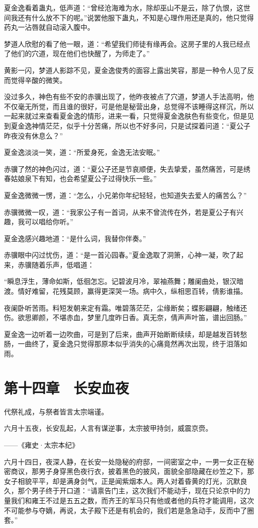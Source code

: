夏金逸看着蛊丸，低声道：“曾经沧海难为水，除却巫山不是云，除了仇恨，这世间我还有什么放不下的呢。”说罢他服下蛊丸，不知是心理作用还是真的，他只觉得药丸一沾唇就自动滚入腹中。

梦道人欣慰的看了他一眼，道：“希望我们师徒有缘再会。这房子里的人我已经点了他们的穴道，现在他们也快醒了，为师走了。”

黄影一闪，梦道人影踪不见，夏金逸俊秀的面容上露出笑容，那是一种令人见了反而觉得辛酸的微笑。

没过多久，神色有些不安的赤骥出现了，他昨夜被点了穴道，梦道人手法高明，他不仅毫无所觉，而且谁的很好，可是他是秘营出身，总觉得不该睡得这样沉，所以一起来就过来查看夏金逸的情形，进来一看，只觉得夏金逸肤色有些变化，但是见到夏金逸神情茫茫，似乎十分苦痛，所以也不好多问，只是试探着问道：“夏公子昨夜没有休息么？”

夏金逸淡淡一笑，道：“所爱身死，金逸无法安眠。”

赤骥了然的神色闪过，道：“夏公子还是节哀顺便，失去挚爱，虽然痛苦，可是绣春姑娘泉下有知，也会希望夏公子过得快乐一些。”

夏金逸微微一愣，道：“怎么，小兄弟你年纪轻轻，也知道失去爱人的痛苦么？”

赤骥微微一叹，道：“我家公子有一首词，从来不曾流传在外，若是夏公子有兴趣，我可以唱给你听。”

夏金逸感兴趣地道：“是什么词，我替你伴奏。”

赤骥眼中闪过忧伤，道：“是一首沁园春。”夏金逸取了洞箫，心神一凝，吹了起来，赤骥随着乐声，低唱道：

“瞬息浮生，薄命如斯，低徊怎忘。记碧波月冷，翠袖燕舞；雕阑曲处，银汉暗渡。情好难留，花残莫顾，赢得更深哭一场。病中久，纵相思百转，倩影谁描。

夜阑卧听苦雨。料短发朝来定有霜。唯碧落茫茫，尘缘断矣；蝶影翩翩，触绪还伤。欲思卿颜，不堪赤血，梦里几度昨日香。真无奈，倩声声叶笛，谱出回肠。”

夏金逸一边听着一边吹曲，可是到了后来，曲声开始断断续续，却是越发百转愁肠，一曲终了，夏金逸只觉得那原本似乎消失的心痛竟然再次出现，终于泪落如雨。

\chapter{第十四章　长安血夜}

代祭礼成，与祭者皆言太宗端谨。

六月十五夜，长安乱起，人言有谋逆事，太宗披甲持剑，威震京赍。

——《雍史·太宗本纪》

六月十四日，夜深人静，在长安一处隐秘的府邸，一间密室之中，一男一女正在秘密商议，那男子身穿黑色夜行衣，披着黑色的披风，面貌全部隐藏在纱笠之下，那女子相貌平平，却是满身剑气，正是闻紫烟本人。两人对着昏黄的灯光，沉默良久，那个男子终于开口道：“请禀告门主，这次我们不能动手，现在只论京中的力量我们和雍王不过是五五之数，而齐王的军马只有他或者他的兵符才能调用，这次不可能参与夺嫡，再说，太子殿下还是有机会的，我们若是急急动手，反而中了圈套。”


